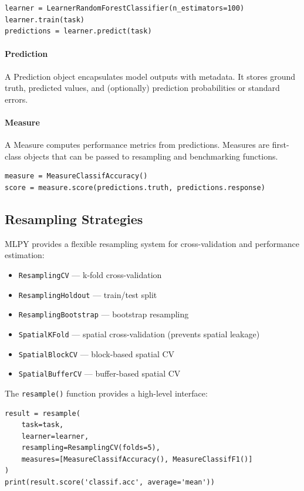 \documentclass[twoside,11pt]{article}
\begin{document}
\begin{lstlisting}
learner = LearnerRandomForestClassifier(n_estimators=100)
learner.train(task)
predictions = learner.predict(task)
\end{lstlisting}

\paragraph{Prediction}
A Prediction object encapsulates model outputs with metadata. It stores ground
truth, predicted values, and (optionally) prediction probabilities or standard
errors.

\paragraph{Measure}
A Measure computes performance metrics from predictions. Measures are first-class
objects that can be passed to resampling and benchmarking functions.

\begin{lstlisting}
measure = MeasureClassifAccuracy()
score = measure.score(predictions.truth, predictions.response)
\end{lstlisting}

\subsection{Resampling Strategies}

MLPY provides a flexible resampling system for cross-validation and performance
estimation:

\begin{itemize}
  \item \texttt{ResamplingCV} --- k-fold cross-validation
  \item \texttt{ResamplingHoldout} --- train/test split
  \item \texttt{ResamplingBootstrap} --- bootstrap resampling
  \item \texttt{SpatialKFold} --- spatial cross-validation (prevents spatial leakage)
  \item \texttt{SpatialBlockCV} --- block-based spatial CV
  \item \texttt{SpatialBufferCV} --- buffer-based spatial CV
\end{itemize}

The \texttt{resample()} function provides a high-level interface:

\begin{lstlisting}
result = resample(
    task=task,
    learner=learner,
    resampling=ResamplingCV(folds=5),
    measures=[MeasureClassifAccuracy(), MeasureClassifF1()]
)
print(result.score('classif.acc', average='mean'))
\end{lstlisting}
\end{document}

